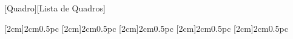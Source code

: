 \usepackage{titlesec} %
\titleformat{\section}{\normalfont\normalsize\bfseries\uppercase}{\thesection}{1em}{}
\titleformat{\subsection}{\normalfont\normalsize\uppercase}{\thesubsection}{1em}{}
\titleformat{\subsubsection}{\normalfont\normalsize\bfseries}{\thesubsubsection}{1em}{}
\titleformat{\paragraph}{\normalfont\normalsize\itshape}{\theparagraph}{1em}{}
\titleformat{\subparagraph}{\normalfont\normalsize}{\thesubparagraph}{1em}{}


[Quadro][Lista de Quadros] %


\usepackage{tocloft} %

\renewcommand{\cfttoctitlefont}{\hspace*{\fill}\normalsize\bfseries\MakeUppercase}
\renewcommand{\cftaftertoctitle}{\hspace*{\fill}}
\renewcommand{\cftlottitlefont}{\hspace*{\fill}\normalsize\bfseries\MakeUppercase}
\renewcommand{\cftafterlottitle}{\hspace*{\fill}}
\renewcommand{\cftloftitlefont}{\hspace*{\fill}\normalsize\bfseries\MakeUppercase}
\renewcommand{\cftafterloftitle}{\hspace*{\fill}}


\usepackage{titletoc} %
[2cm]{\bfseries}{2cm}{0.5pc}
[2cm]{}{2cm}{0.5pc}
[2cm]{\bfseries}{2cm}{0.5pc}
[2cm]{\itshape}{2cm}{0.5pc}
[2cm]{}{2cm}{0.5pc}
\renewcommand{\contentsname}{\centering Contents}



